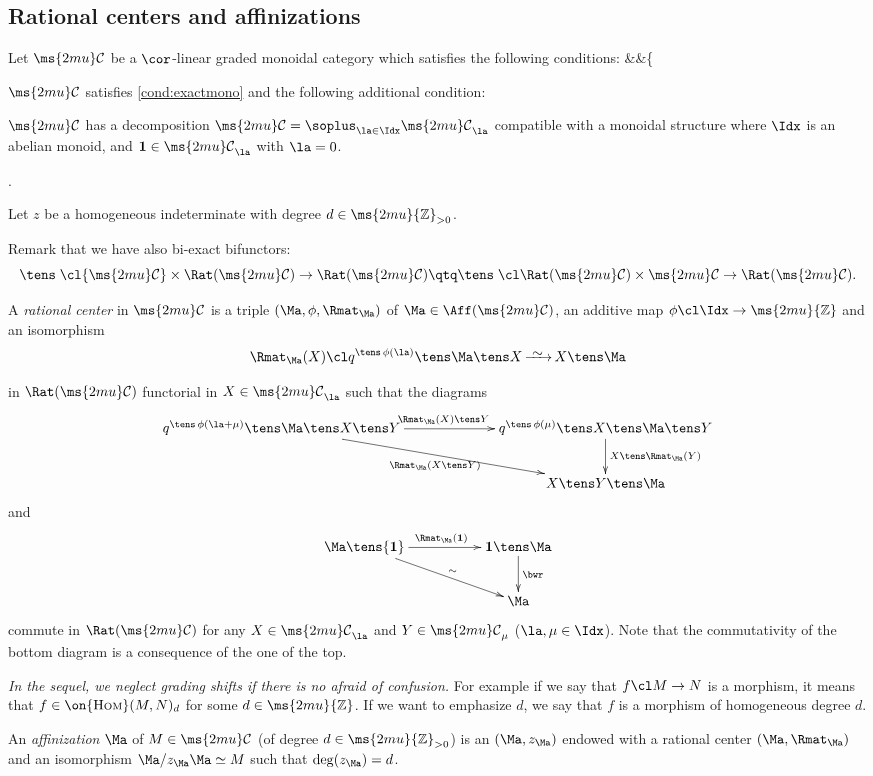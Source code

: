 \documentclass[12pt,leqno]{amsart}%
\theoremstyle{plain}
\theoremstyle{definition}
\newcommand{\Z}{\ms{2mu}{\mathbb Z}}
\newcommand{\one}{{\bf{1}}}
\newcommand{\HOM}{\on{\mathrm{H{\scriptstyle OM}}}}
\newcommand{\isoto}[1][]{\mathop{\xrightarrow%
[{\raisebox{.3ex}[0ex][.3ex]{$\scriptstyle{#1}$}}]%
{{\raisebox{-.6ex}[0ex][-.6ex]{$\mspace{5mu}\sim\mspace{5mu}$}}}}}
\newcommand{\z}[1][{\Ma}]{{z_{#1}}}
\newcommand{\bna}{\be[{\rm(a)}]}
\newcommand{\shc}{{\ms{2mu}\mathcal{C}}}
\newcounter{myc}
\newcounter{mycc}
\numberwithin{equation}{section}
\begin{document}
\subsection{Rational centers and affinizations}
Let $\shc$ be a $\cor$-linear graded monoidal category which satisfies
the following conditions:
\eq
&&\hs{1ex}\left\{\parbox{70ex}{
$\shc$ satisfies \eqref{cond:exactmono} and the following additional condition:
\bna
\setcounter{enumi}{\value{mycc}}
\item $\shc$ has a decomposition $\shc=\soplus_{\la\in\Idx}\shc_\la$
compatible with a monoidal structure where $\Idx$ is an abelian monoid,
and $\one\in \shc_\la$ with $\la=0$. 
\ee
}\right.\label{cond:g}
\eneq

Let $z$ be a homogeneous indeterminate with degree $d\in\Z_{>0}$.


Remark that we have also bi-exact bifunctors:
$$\tens\;\cl \shc\times\Rat(\shc)\to \Rat(\shc)
\qtq \tens\;\cl \Rat(\shc)\times\shc\to \Rat(\shc).$$


\Def\label{def:ratcent}
A {\em rational center} in $\shc$ is a triple $(\Ma,\phi,\Rmat_\Ma)$
of $\Ma\in\Aff(\shc)$, an additive map $\phi\cl\Idx\to\Z$ and an isomorphism 
$$\Rmat_\Ma(X)\cl q^{\tens\,\phi(\la)}\tens\Ma\tens X\isoto X\tens\Ma$$
in $\Rat(\shc)$ functorial in $X\in\shc_\la$ such that the diagrams
$$
\xymatrix@C=15ex
{q^{\tens\,\phi(\la+\mu)}\tens\Ma\tens X\tens Y\ar[r]^{\Rmat_\Ma(X)\tens Y}\ar[dr]_{\Rmat_\Ma(X\tens Y)}&q^{\tens\,\phi(\mu)}\tens X\tens\Ma\tens Y\ar[d]^{X\tens\Rmat_\Ma(Y)}\\
&X\tens Y\tens\Ma}$$
and $$\xymatrix@C=12ex{\Ma\tens\one\ar[r]^{\Rmat_\Ma(\one)}\ar[dr]^-{\sim}&\one\tens \Ma\ar[d]^\bwr\\
&\Ma}
$$
commute in $\Rat(\shc)$ for any $X\in\shc_\la$ and $Y\in\shc_\mu$ ($\la,\mu\in\Idx$).
\edf
Note that the commutativity of the bottom diagram is a consequence of the one of the top.

{\em In the sequel, we neglect grading shifts if there is no afraid of confusion.}
For example if we say that $f\cl M\to N$ is a morphism,
it means that $f\in\HOM(M,N)_d$ for some $d\in\Z$.
If we want to emphasize $d$, we say that $f$ is a morphism of homogeneous degree $d$.

\label{def:affinization}
An {\em affinization} $\Ma$ of $M\in\shc$ (of degree $d\in\Z_{>0}$) is an \afn 
$(\Ma,\z)$ endowed with a rational center $(\Ma,\Rmat_\Ma)$ and an isomorphism
$\Ma/\z\Ma\simeq M$ such that $\deg(\z)=d$. 
\edf
\end{document}
